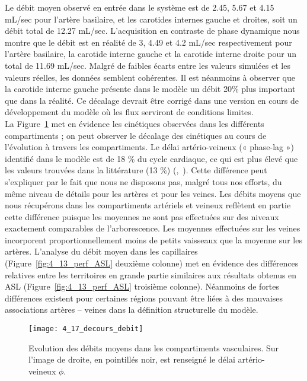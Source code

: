 Le débit moyen observé en entrée dans le système est de 2.45, 5.67 et 4.15 mL/sec pour
l’artère basilaire, et les carotides internes gauche et droites, soit un débit total de 12.27 mL/sec.
L’acquisition en contraste de phase dynamique nous montre que le débit est en réalité de 3, 4.49 et
4.2 mL/sec respectivement pour l’artère basilaire, la carotide interne gauche et la carotide interne
droite pour un total de 11.69 mL/sec. Malgré de faibles écarts entre les valeurs simulées et les valeurs
réelles, les données semblent cohérentes. Il est néanmoins à observer que la carotide interne gauche
présente dans le modèle un débit 20\% plus important que dans la réalité. Ce décalage devrait être
corrigé dans une version en cours de développement du modèle où les flux serviront de conditions
limites.\\
La Figure~\ref{fig:4_17_decours_debit} met en évidence les cinétiques observées dans les différents compartiments ; on
peut observer le décalage des cinétiques au cours de l’évolution à travers les compartiments. Le délai
artério-veineux (« phase-lag ») identifié dans le modèle est de 18 \% du cycle cardiaque, ce qui est plus
élevé que les valeurs trouvées dans la littérature (13 \%) (\cite{Linninger2009},~\cite{Kim2007}). Cette différence peut s’expliquer par
le fait que nous ne disposons pas, malgré tous nos efforts, du même niveau de détails pour les artères
et pour les veines. Les débits moyens que nous récupérons dans les compartiments artériels et veineux
reflètent en partie cette différence puisque les moyennes ne sont pas effectuées sur des niveaux
exactement comparables de l’arborescence. Les moyennes effectuées sur les veines incorporent
proportionnellement moins de petits vaisseaux que la moyenne sur les artères. L’analyse du débit
moyen dans les capillaires (Figure~\ref{fig:4_13_perf_ASL} deuxième colonne) met en évidence des différences relatives
entre les territoires en grande partie similaires aux résultats obtenus en ASL (Figure~\ref{fig:4_13_perf_ASL} troisième
colonne). Néanmoins de fortes différences existent pour certaines régions pouvant être liées à des
mauvaises associations artères – veines dans la définition structurelle du modèle.\\
\begin{figure}[!t]
\centering
\texttt{[image: 4\_17\_decours\_debit]}
\caption{Evolution des débits moyens dans les compartiments vasculaires. Sur l’image de droite, en pointillés noir, est
renseigné le délai artério-veineux $\phi$.}
\label{fig:4_17_decours_debit}	
\end{figure}
